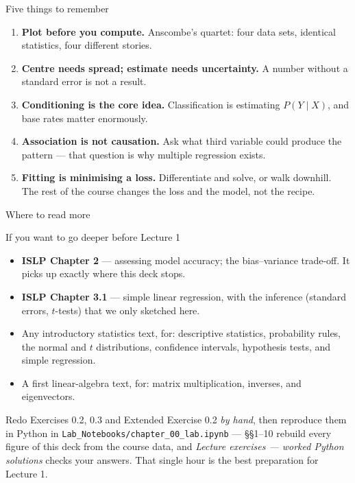 \documentclass[aspectratio=169,11pt]{beamer}
\begin{document}
\begin{frame}{Five things to remember}
  \begin{enumerate}
    \item \textbf{Plot before you compute.} Anscombe's quartet: four data
          sets, identical statistics, four different stories.
    \item \textbf{Centre needs spread; estimate needs uncertainty.} A number
          without a standard error is not a result.
    \item \textbf{Conditioning is the core idea.} Classification is
          estimating $P(Y \mid X)$, and base rates matter enormously.
    \item \textbf{Association is not causation.} Ask what third variable
          could produce the pattern --- that question is why multiple
          regression exists.
    \item \textbf{Fitting is minimising a loss.} Differentiate and solve, or
          walk downhill. The rest of the course changes the loss and the
          model, not the recipe.
  \end{enumerate}
\end{frame}

\begin{frame}{Where to read more}
  \footnotesize
  \begin{block}{If you want to go deeper before Lecture 1}
    \begin{itemize}
      \item \textbf{ISLP Chapter 2} --- assessing model accuracy; the
            bias--variance trade-off. It picks up exactly where this deck
            stops.
      \item \textbf{ISLP Chapter 3.1} --- simple linear regression, with the
            inference (standard errors, $t$-tests) that we only sketched here.
      \item Any introductory statistics text, for: descriptive statistics,
            probability rules, the normal and $t$ distributions, confidence
            intervals, hypothesis tests, and simple regression.
      \item A first linear-algebra text, for: matrix multiplication,
            inverses, and eigenvectors.
    \end{itemize}
  \end{block}
  \begin{labnote}
    Redo Exercises 0.2, 0.3 and Extended Exercise 0.2 \emph{by hand}, then
    reproduce them in Python in \texttt{Lab\_Notebooks/chapter\_00\_lab.ipynb}
    --- \S\S1--10 rebuild every figure of this deck from the course data, and
    \emph{Lecture exercises --- worked Python solutions} checks your answers. That single hour is the best
    preparation for Lecture 1.
  \end{labnote}
\end{frame}
\end{document}
